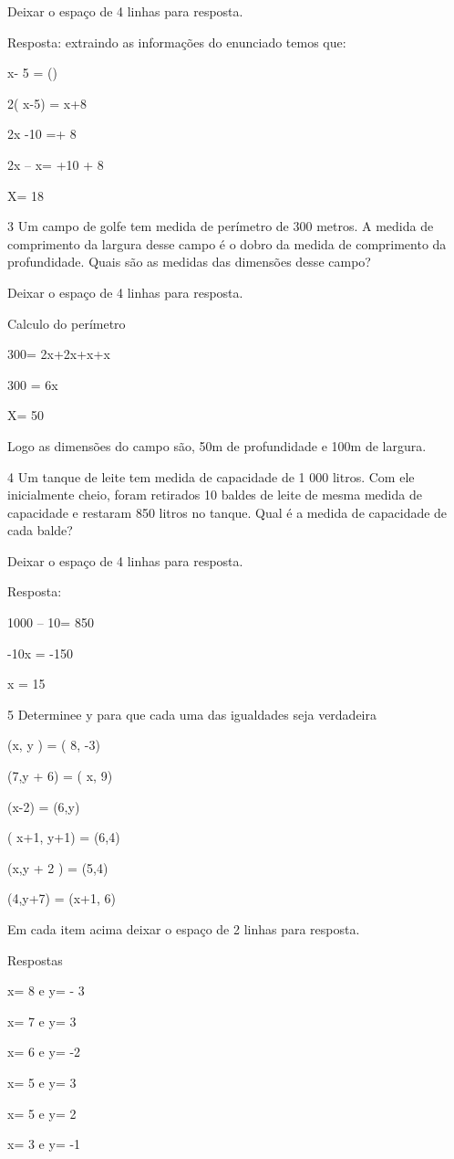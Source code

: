 Deixar o espaço de 4 linhas para resposta.

Resposta: extraindo as informações do enunciado temos que:

x- 5 = ()

2( x-5) = x+8

2x -10 =\times + 8

2x -- x= +10 + 8

X= 18

\num{3} Um campo de golfe tem medida de perímetro de 300 metros. A medida de
comprimento da largura desse campo é o dobro da medida de comprimento da
profundidade. Quais são as medidas das dimensões desse campo?

Deixar o espaço de 4 linhas para resposta.

Calculo do perímetro

300= 2x+2x+x+x

300 = 6x

X= 50

Logo as dimensões do campo são, 50m de profundidade e 100m de largura.

\num{4} Um tanque de leite tem medida de capacidade de 1 000 litros. Com ele
inicialmente cheio, foram retirados 10 baldes de leite de mesma medida
de capacidade e restaram 850 litros no tanque. Qual é a medida de
capacidade de cada balde?

Deixar o espaço de 4 linhas para resposta.

Resposta:

1000 -- 10\times = 850

-10x = -150

x = 15

\num{5} Determine\times e y para que cada uma das igualdades seja verdadeira

\item (x, y ) = ( 8, -3)
\item (7,y + 6) = ( x, 9)
\item (x-2) = (6,y)
\item ( x+1, y+1) = (6,4)
\item (x,y + 2 ) = (5,4)
\item (4,y+7) = (x+1, 6)

Em cada item acima deixar o espaço de 2 linhas para resposta.

Respostas

\item x= 8 e y= - 3
\item x= 7 e y= 3
\item x= 6 e y= -2
\item x= 5 e y= 3
\item x= 5 e y= 2
\item x= 3 e y= -1

